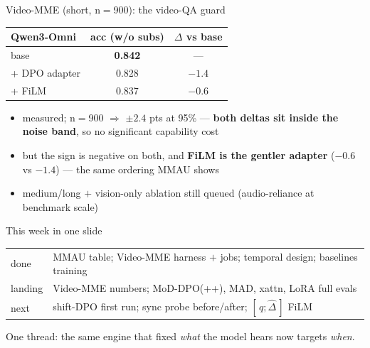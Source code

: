 \documentclass[aspectratio=169,11pt]{beamer}
\begin{document}
\begin{frame}{Video-MME (short, n$=$900): the video-QA guard}
\centering\small
\renewcommand{\arraystretch}{1.2}
\begin{tabular}{l c c}
\toprule
Qwen3-Omni & acc (w/o subs) & $\Delta$ vs base \\
\midrule
base            & \textbf{0.842} & ---    \\ %
+ DPO adapter   & 0.828          & $-1.4$ \\ %
+ FiLM          & 0.837          & $-0.6$ \\ %
\bottomrule
\end{tabular}
\vfill
\begin{itemize}\footnotesize
\item measured; n$=$900 $\Rightarrow$ $\pm2.4$ pts at 95\% --- \textbf{both deltas sit inside the
noise band}, so no significant capability cost
\item but the sign is negative on both, and \textbf{FiLM is the gentler adapter} ($-0.6$ vs $-1.4$)
--- the same ordering MMAU shows
\item medium/long $+$ vision-only ablation still queued (audio-reliance at benchmark scale)
\end{itemize}
\end{frame}

\begin{frame}{This week in one slide}
\centering
\renewcommand{\arraystretch}{1.3}
\small
\begin{tabular}{l l}
\toprule
done & MMAU table; Video-MME harness $+$ jobs; temporal design; baselines training \\
landing & Video-MME numbers; MoD-DPO(++), MAD, xattn, LoRA full evals \\
next & shift-DPO first run; sync probe before/after; $[\,q;\hat\Delta\,]$ FiLM \\
\bottomrule
\end{tabular}
\vfill
{\footnotesize One thread: the same engine that fixed \emph{what} the model hears now targets \emph{when}.}
\end{frame}
\end{document}
